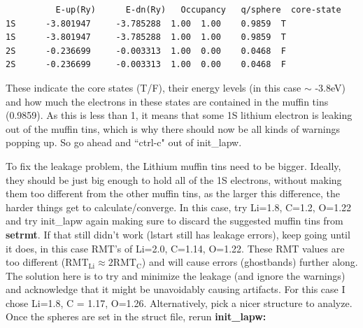 \documentclass[12pt]{article}
\begin{document}
\begin{itemize}
	\begin{lstlisting}
          E-up(Ry)      E-dn(Ry)   Occupancy   q/sphere  core-state
1S      -3.801947     -3.785288  1.00  1.00    0.9859  T
1S      -3.801947     -3.785288  1.00  1.00    0.9859  T
2S      -0.236699     -0.003313  1.00  0.00    0.0468  F
2S      -0.236699     -0.003313  1.00  0.00    0.0468  F
	\end{lstlisting}
	
	These indicate the core states (T/F), their energy levels (in this case $\sim$ -3.8eV) and how much the electrons in these states are contained in the muffin tins (0.9859).  As this is less than 1, it means that some 1S lithium electron is leaking out of the muffin tins, which is why there should now be all kinds of warnings popping up.  So go ahead and ``ctrl-c" out of init\_lapw.
	
\end{itemize}  

To fix the leakage problem, the Lithium muffin tins need to be bigger.   Ideally, they should be just big enough to hold all of the 1S electrons, without making them too different from the other muffin tins, as the larger this difference, the harder things get to calculate/converge.  In this case, try Li=1.8,  C=1.2, O=1.22 and try init\_lapw again making sure to discard the suggested muffin tins from \textbf{setrmt}. If that still didn't work (lstart still has leakage errors), keep going until it does, in this case RMT's of Li=2.0,  C=1.14, O=1.22.  These RMT values are too different ($\mathrm{RMT_{Li}} \approx 2\mathrm{RMT_C}$) and will cause errors  (ghostbands) further along.  The solution here is to try and minimize the leakage (and ignore the warnings) and acknowledge that it might be unavoidably causing artifacts. For this case I chose Li=1.8, C = 1.17, O=1.26. Alternatively, pick a nicer structure to analyze.  Once the spheres are set in the struct file, rerun \textbf{init\_lapw:}
\end{document}
